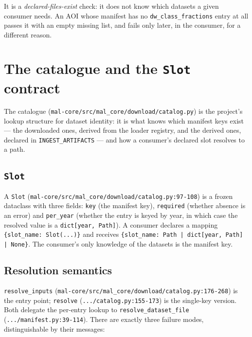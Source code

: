 \documentclass[11pt,a4paper]{article}
\newcommand{\code}[1]{\texttt{#1}}
\begin{document}
It is a \emph{declared-files-exist} check: it does not know which datasets a
given consumer needs. An AOI whose manifest has no \code{dw\_class\_fractions}
entry at all passes it with an empty missing list, and fails only later, in
the consumer, for a different reason.

\section{The catalogue and the \code{Slot} contract}
\label{sec:slots}

The catalogue (\code{mal-core/src/mal\_core/download/catalog.py}) is the
project's lookup structure for dataset identity: it is what knows which
manifest keys exist --- the downloaded ones, derived from the loader
registry, and the derived ones, declared in \code{INGEST\_ARTIFACTS} --- and
how a consumer's declared slot resolves to a path.

\subsection{\code{Slot}}

A \code{Slot}
(\code{mal-core/src/mal\_core/download/catalog.py:97-108}) is a frozen
dataclass with three fields: \code{key} (the manifest key),
\code{required} (whether absence is an error) and \code{per\_year} (whether
the entry is keyed by year, in which case the resolved value is a
\code{dict[year, Path]}). A consumer declares a mapping
\code{\{slot\_name: Slot(...)\}} and receives
\code{\{slot\_name: Path | dict[year, Path] | None\}}. The consumer's only
knowledge of the datasets is the manifest key.

\subsection{Resolution semantics}

\code{resolve\_inputs}
(\code{mal-core/src/mal\_core/download/catalog.py:176-268}) is the entry
point; \code{resolve} (\code{.../catalog.py:155-173}) is the single-key
version. Both delegate the per-entry lookup to
\code{resolve\_dataset\_file}
(\code{.../manifest.py:39-114}). There are exactly three failure modes,
distinguishable by their messages:
\end{document}
